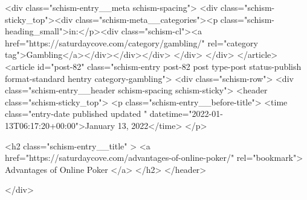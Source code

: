 {		<div class="schism-entry__meta schism-spacing">			<div class="schism-sticky_top"><div class="schism-meta__categories"><p class="schism-heading_small">in:</p><div class="schism-cl"><a href="https://saturdaycove.com/category/gambling/" rel="category tag">Gambling</a></div></div></div>		</div>
	</div>
</article>
<article id="post-82" class="schism-entry post-82 post type-post status-publish format-standard hentry category-gambling">
	<div class="schism-row">		<div class="schism-entry__header schism-spacing schism-sticky">			<header class="schism-sticky_top">				<p class="schism-entry__before-title">
					<time class="entry-date published updated " datetime="2022-01-13T06:17:20+00:00">January 13, 2022</time>				</p>

				<h2 class="schism-entry__title" >
					<a href="https://saturdaycove.com/advantages-of-online-poker/" rel="bookmark">
						Advantages of Online Poker					</a>
				</h2>
			</header>

					</div>

}
